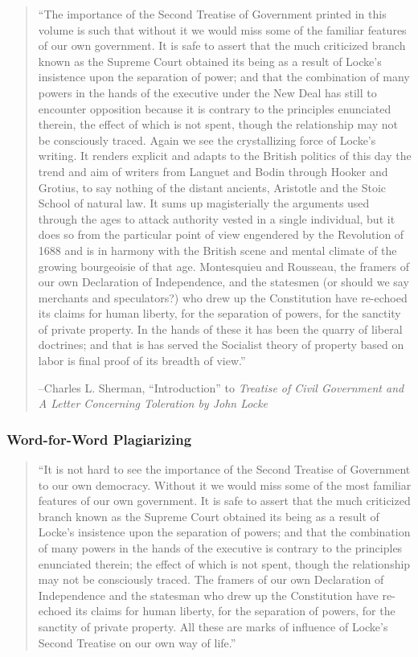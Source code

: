 \begin{quote}“The importance of the Second Treatise of Government printed in this volume is such that without it we would miss some of the familiar features of our own government. It is safe to assert that the much criticized branch known as the Supreme Court obtained its being as a result of Locke’s insistence upon the separation of power; and that the combination of many powers in the hands of the executive under the New Deal has still to encounter opposition because it is contrary to the principles enunciated therein, the effect of which is not spent, though the relationship may not be consciously traced. Again we see the crystallizing force of Locke’s writing. It renders explicit and adapts to the British politics of this day the trend and aim of writers from Languet and Bodin through Hooker and Grotius, to say nothing of the distant ancients, Aristotle and the Stoic School of natural law. It sums up magisterially the arguments used through the ages to attack authority vested in a single individual, but it does so from the particular point of view engendered by the Revolution of 1688 and is in harmony with the British scene and mental climate of the growing bourgeoisie of that age. Montesquieu and Rousseau, the framers of our own Declaration of Independence, and the statesmen (or should we say merchants and speculators?) who drew up the Constitution have re-echoed its claims for human liberty, for the separation of powers, for the sanctity of private property. In the hands of these it has been the quarry of liberal doctrines; and that is has served the Socialist theory of property based on labor is final proof of its breadth of view.”

--Charles L. Sherman, “Introduction” to \emph{Treatise of Civil Government and A Letter Concerning Toleration by John Locke}

\end{quote}

\subsubsection{Word-for-Word Plagiarizing}

\begin{quote}“It is not hard to see the importance of the Second Treatise of Government to our own democracy. Without it we would miss some of the most familiar features of our own government. It is safe to assert that the much criticized branch known as the Supreme Court obtained its being as a result of Locke’s insistence upon the separation of powers; and that the combination of many powers in the hands of the executive is contrary to the principles enunciated therein; the effect of which is not spent, though the relationship may not be consciously traced. The framers of our own Declaration of Independence and the statesman who drew up the Constitution have re-echoed its claims for human liberty, for the separation of powers, for the sanctity of private property. All these are marks of influence of Locke’s Second Treatise on our own way of life.”
\end{quote}


